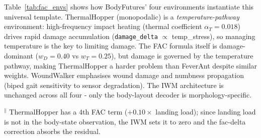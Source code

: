 \documentclass{article}
\begin{document}
{Table~\ref{tab:fac_envs} shows how BodyFutures' four environments instantiate this universal template.  ThermalHopper (monopodalic) is a \emph{temperature-pathway} environment: high-frequency impact heating (thermal coefficient $\alpha_T = 0.018$) drives rapid damage accumulation (\texttt{damage\_delta} $\propto$ temp\_stress), so managing temperature is the key to limiting damage.  The FAC formula itself is damage-dominant ($w_D = 0.40$ vs $w_T = 0.25$), but damage is governed by the temperature pathway, making ThermalHopper a harder problem than FeverAnt despite similar weights. WoundWalker emphasises wound damage and numbness propagation (biped gait sensitivity to sensor degradation). The IWM architecture is unchanged across all four - only the body-layout decoder is morphology-specific.

\begin{table}[H]
\centering
\caption{FAC instantiation across BodyFutures morphologies.
$w_D + w_T + w_E = 1.0$ (FeverAnt, WoundWalker); for ThermalHopper an additional landing-impact term ($w_\mathrm{impact} = 0.10$) is included in the environment but not in the IWM body-state observation (landing load is unobserved). NumbArm uses a numbness-primary formula: $\mathrm{FAC} = 1 - w_N\bar{n} - w_D D - w_E E - w_L L_t$.}
\label{tab:fac_envs}
\begin{minipage}{\linewidth}\raggedright\footnotesize $^\|$ ThermalHopper has a 4th FAC term ($+0.10\times$ landing load); since landing load is not in the body-state observation, the IWM sets it to zero and the fac-delta correction absorbs the residual.\end{minipage}
\end{table}

\vspace{-6pt}
}
\end{document}
